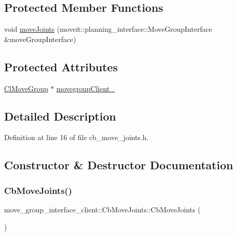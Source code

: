 \subsection*{Protected Member Functions}
\begin{DoxyCompactItemize}
\item 
void \hyperlink{classmove__group__interface__client_1_1CbMoveJoints_aa60670293a8fafcb6e091b85af722822}{move\+Joints} (moveit\+::planning\+\_\+interface\+::\+Move\+Group\+Interface \&move\+Group\+Interface)
\end{DoxyCompactItemize}
\subsection*{Protected Attributes}
\begin{DoxyCompactItemize}
\item 
\hyperlink{classmove__group__interface__client_1_1ClMoveGroup}{Cl\+Move\+Group} $\ast$ \hyperlink{classmove__group__interface__client_1_1CbMoveJoints_a9c1ffe89b25fc5693949241217d73e90}{movegroup\+Client\+\_\+}
\end{DoxyCompactItemize}


\subsection{Detailed Description}


Definition at line 16 of file cb\+\_\+move\+\_\+joints.\+h.



\subsection{Constructor \& Destructor Documentation}
\mbox{\label{classmove__group__interface__client_1_1CbMoveJoints_a946c2fd5f9b5415fa9b6a5976fe1b750}} 
\subsubsection{\texorpdfstring{Cb\+Move\+Joints()}{CbMoveJoints()}\hspace{0.1cm}{\footnotesize\ttfamily [1/2]}}
{\footnotesize\ttfamily move\+\_\+group\+\_\+interface\+\_\+client\+::\+Cb\+Move\+Joints\+::\+Cb\+Move\+Joints (\begin{DoxyParamCaption}{ }\end{DoxyParamCaption})}



